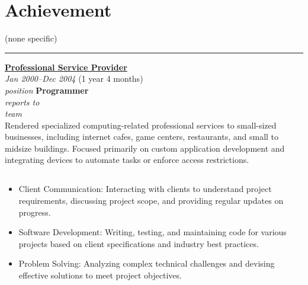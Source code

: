 \documentclass[12pt]{res}
\begin{document}
\begin{resume}
\begin{minipage}[t]{0.42\linewidth}
	\section{Achievement}
	\begin{flushleft}
        \begin{itemize}
		\footnotesize{(none specific)}
        \end{itemize}
	\end{flushleft}
\end{minipage}

\vspace{10pt}
\rule{1.0\textwidth}{0.1pt}

\begin{multicols}{2}
	{\large {\bf \href{#}{Professional Service Provider}}} \\
	{\footnotesize{\sl Jan 2000--Dec 2004} \hfill (1 year 4 months)}\\
	{\footnotesize{\sl position} \hfill \bf{Programmer}}\\
	{\footnotesize{\sl reports to} \hfill }\\
	{\footnotesize{\sl team} \hfill }\\

	\columnbreak
	{\footnotesize{Rendered specialized computing-related professional services to small-sized businesses, including internet cafes, game centers, restaurants, and small to midsize buildings. Focused primarily on custom application development and integrating devices to automate tasks or enforce access restrictions.}}\\
\end{multicols}
\vspace{-20pt}

\begin{multicols}{2}
	\section{}
		\begin{itemize}
			\item Client Communication: Interacting with clients to understand project requirements, discussing project scope, and providing regular updates on progress.

\item Software Development: Writing, testing, and maintaining code for various projects based on client specifications and industry best practices.

\item Problem Solving: Analyzing complex technical challenges and devising effective solutions to meet project objectives.


\end{itemize}
\end{multicols}
\end{resume}
\end{document}

